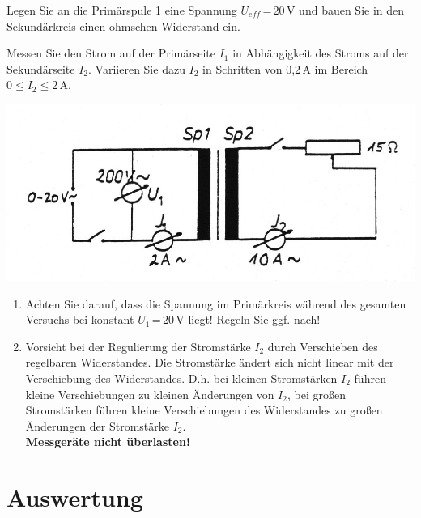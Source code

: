 \begin{enumerate}
	\noindent
	Legen Sie an die Primärspule 1 eine Spannung $U_{eff}$\,=\,20\,V und bauen Sie in den Sekundärkreis einen ohmschen Widerstand ein.\\
		\begin{minipage}{0.55\textwidth}
			Messen Sie den Strom auf der Primärseite $I_1$ in Abhängigkeit des Stroms auf der Sekundärseite $I_2$. Variieren Sie dazu $I_2$ in Schritten von 0,2\,A im Bereich $0\leq I_2\leq 2$\,A.\\
		\end{minipage}
		\begin{minipage}{0.45\textwidth}
			\includegraphics[width=\textwidth]{Versuch_15-16/Abbildungen/BILD22.jpg}
			\label{fig:Bild22}
		\end{minipage}
		
	\begin{important}
	\begin{enumerate}[label={\roman*}.]
		\item Achten Sie darauf, dass die Spannung im Primärkreis während des gesamten Versuchs bei konstant $U_1$\,=\,20\,V liegt! Regeln Sie ggf. nach!
		\item Vorsicht bei der Regulierung der Stromstärke $I_2$ durch Verschieben des regelbaren Widerstandes. Die Stromstärke ändert sich nicht linear mit der Verschiebung des Widerstandes. D.h. bei kleinen Stromstärken $I_2$ 
			führen kleine Verschiebungen zu kleinen Änderungen von $I_2$, bei großen Stromstärken führen kleine Verschiebungen des Widerstandes zu großen Änderungen der Stromstärke $I_2$.\\
			\textbf{Messgeräte nicht überlasten!}
	\end{enumerate}
	\end{important}
\end{enumerate}

\section{Auswertung} 

